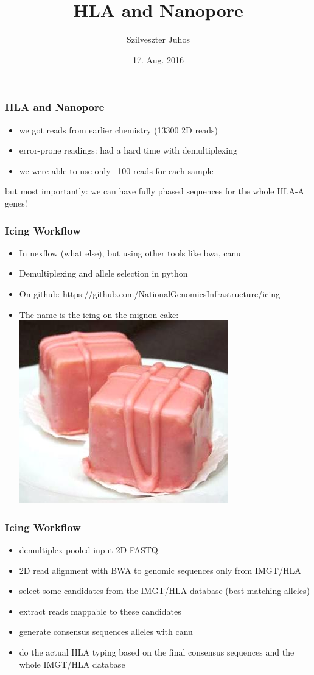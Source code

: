 \documentclass{beamer}
\title{HLA and Nanopore}
\author{Szilveszter Juhos}
\institute{SciLifeLab}
\date{17. Aug. 2016 }
\begin{document}
\frame{\titlepage}
			  
\begin{frame}
\frametitle{HLA and Nanopore}
\begin{itemize}
	\item we got reads from earlier chemistry (13300 2D reads)
	\item error-prone readings: had a hard time with demultiplexing
	\item we were able to use only ~100 reads for each sample
\end{itemize}

\begin{block}{but most importantly:}
we can have fully phased sequences for the whole HLA-A genes! 
\end{block}
\end{frame}

\begin{frame}
\frametitle{Icing Workflow}
\begin{itemize}
	\item In nexflow (what else), but using other tools like bwa, canu
	\item Demultiplexing and allele selection in python
	\item On github: https://github.com/NationalGenomicsInfrastructure/icing
	\item The name is the icing on the mignon cake: \includegraphics[width=0.3\linewidth]{minyon.jpg}
\end{itemize}
\end{frame}

\begin{frame}
\frametitle{Icing Workflow}
\begin{itemize}
	\item demultiplex pooled input 2D FASTQ
	\item 2D read alignment with BWA to genomic sequences only from IMGT/HLA
	\item select some candidates from the IMGT/HLA database (best matching alleles)
	\item extract reads mappable to these candidates
	\item generate consensus sequences alleles with canu
	\item do the actual HLA typing based on the final consensus sequences and the whole IMGT/HLA database
\end{itemize}
\end{frame}
\end{document}
